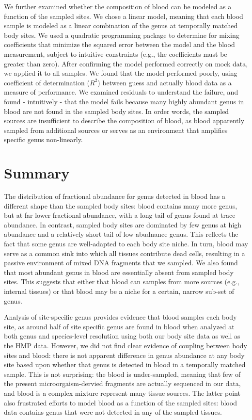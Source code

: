 We further examined whether the composition of blood can be modeled as a function of the sampled sites. We chose a linear model, meaning that each blood sample is modeled as a linear combination of the genus at temporally matched body sites. We used a quadratic programming package to determine for mixing coefficients that minimize the squared error between the model and the blood measurement, subject to intuitive constraints (e.g., the coefficients must be greater than zero). After confirming the model performed correctly on mock data, we applied it to all samples. We found that the model performed poorly, using coefficient of determination ($R^2$) between guess and actually blood data as a measure of performance. We examined residuals to understand the failure, and found - intuitively - that the model fails because many highly abundant genus in blood are not found in the sampled body sites. In order words, the sampled sources are insufficient to describe the composition of blood, as blood apparently sampled from additional sources or serves as an environment that amplifies specific genus non-linearly.

\section{Summary}

The distribution of fractional abundance for genus detected in blood has a different shape than the sampled body sites: blood contains many more genus, but at far lower fractional abundance, with a long tail of genus found at trace abundance. In contrast, sampled body sites are dominated by few genus at high abundance and a relatively short tail of low-abudnance genus. This reflects the fact that some genus are well-adapted to each body site niche. In turn, blood may serve as a common sink into which all tissues contribute dead cells, resulting in a passive environment of mixed DNA fragments that we sampled. We also found that most abundant genus in blood are essentially absent from sampled body sites. This suggests that either that blood can samples from more sources (e.g., internal tissues) or that blood may be a niche for a certain, narrow sub-set of genus. 

Analysis of site-specific genus provides evidence that blood samples each body site, as around half of site specific genus are found in blood when analyzed at both genus and species-level resolution using both our body site data as well as the HMP data. However, we did not find clear evidence of coupling between body sites and blood: there is not apparent difference in genus abundance at any body site based upon whether that genus is detected in blood in a temporally matched sample. This is not surprising: the blood is under-sampled, meaning that few of the present microorgaism-dervied fragments are actually sequenced in our data, and blood is a complex mixture represent many tissue sources. The latter point also frustrated efforts to model blood as a function of the sampled sites: blood data contains genus that were not detected in any of the sampled tissues. 
